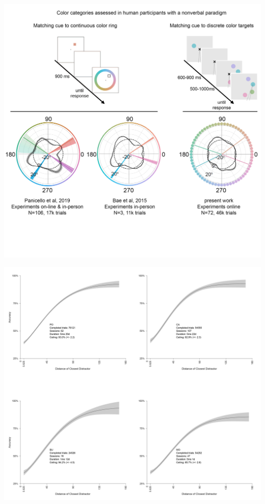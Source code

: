 \begin{appendixbox}
        \includegraphics[width=\textwidth]{../Figures/flat/SI1_Human.jpg}
        \label{fig:Human}
\end{appendixbox}

\begin{appendixbox}
        \includegraphics[width=\textwidth]{../Figures/flat/SI2_psychometric.jpg}
        \label{fig:IndiDiff}
\end{appendixbox}

